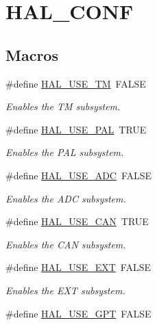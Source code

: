 \hypertarget{group___h_a_l___c_o_n_f}{}\section{H\+A\+L\+\_\+\+C\+O\+N\+F}
\label{group___h_a_l___c_o_n_f}
\subsection*{Macros}
\begin{DoxyCompactItemize}
\item 
\#define \hyperlink{group___h_a_l___c_o_n_f_ga989811956a40f9270a092212a8570632}{H\+A\+L\+\_\+\+U\+S\+E\+\_\+\+T\+M}~F\+A\+L\+S\+E
\begin{DoxyCompactList}\small\item\em Enables the T\+M subsystem. \end{DoxyCompactList}\item 
\#define \hyperlink{group___h_a_l___c_o_n_f_ga2311bcc7b41bfba183c9ec1a64a11e93}{H\+A\+L\+\_\+\+U\+S\+E\+\_\+\+P\+A\+L}~T\+R\+U\+E
\begin{DoxyCompactList}\small\item\em Enables the P\+A\+L subsystem. \end{DoxyCompactList}\item 
\#define \hyperlink{group___h_a_l___c_o_n_f_ga413a1b6c0ca2c9e524df50ceac1275fd}{H\+A\+L\+\_\+\+U\+S\+E\+\_\+\+A\+D\+C}~F\+A\+L\+S\+E
\begin{DoxyCompactList}\small\item\em Enables the A\+D\+C subsystem. \end{DoxyCompactList}\item 
\#define \hyperlink{group___h_a_l___c_o_n_f_ga2e351185eace5acfd90b65c9fe796355}{H\+A\+L\+\_\+\+U\+S\+E\+\_\+\+C\+A\+N}~T\+R\+U\+E
\begin{DoxyCompactList}\small\item\em Enables the C\+A\+N subsystem. \end{DoxyCompactList}\item 
\#define \hyperlink{group___h_a_l___c_o_n_f_ga2dd40c0fdd833b861f9241f6d282fe34}{H\+A\+L\+\_\+\+U\+S\+E\+\_\+\+E\+X\+T}~F\+A\+L\+S\+E
\begin{DoxyCompactList}\small\item\em Enables the E\+X\+T subsystem. \end{DoxyCompactList}\item 
\#define \hyperlink{group___h_a_l___c_o_n_f_gab4702b9e1b6fa2869e26c274fccd53f0}{H\+A\+L\+\_\+\+U\+S\+E\+\_\+\+G\+P\+T}~F\+A\+L\+S\+E

\end{DoxyCompactItemize}
